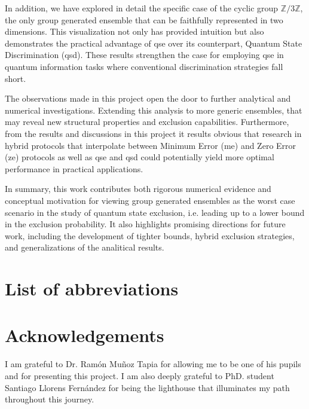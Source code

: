 \documentclass[12pt,letterpaper]{article}
\begin{document}
In addition, we have explored in detail the specific case of the cyclic group $\mathbb{Z}/3\mathbb{Z}$, the only group generated ensemble that can be faithfully represented in two dimensions. This visualization not only has provided intuition but also demonstrates the practical advantage of \gls{qse} over its counterpart, Quantum State Discrimination (\gls{qsd}). These results strengthen the case for employing \gls{qse} in quantum information tasks where conventional discrimination strategies fall short.

The observations made in this project open the door to further analytical and numerical investigations. Extending this analysis to more generic ensembles, that may reveal new structural properties and exclusion capabilities. Furthermore, from the results and discussions in this project it results obvious that research in hybrid protocols that interpolate between Minimum Error (\gls{me}) and Zero Error (\gls{ze}) protocols as well as \gls{qse} and \gls{qsd} could potentially yield more optimal performance in practical applications.

In summary, this work contributes both rigorous numerical evidence and conceptual motivation for viewing group generated ensembles as the worst case scenario in the study of quantum state exclusion, i.e. leading up to a lower bound in the exclusion probability. It also highlights promising directions for future work, including the development of tighter bounds, hybrid exclusion strategies, and generalizations of the analitical results.

\newpage
%
 

\section*{List of abbreviations}
\renewcommand{\glsnamefont}[1]{\textbf{#1}}
\printnoidxglossary[type=main, title={\vspace{-1cm}}, nonumberlist, nogroupskip, style=super]
\newpage
\section*{Acknowledgements}

\hspace{20pt}I am grateful to Dr. Ramón Muñoz Tapia for allowing me to be one of his pupils and for presenting this project. I am also deeply grateful to PhD. student Santiago Llorens Fernández for being the lighthouse that illuminates my path throughout this journey.
\end{document}
